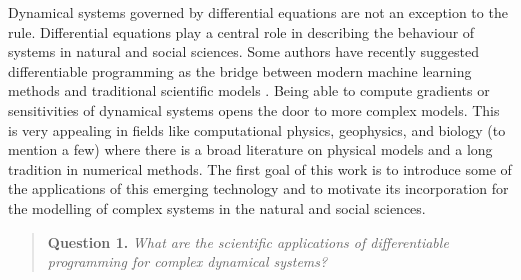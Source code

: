 Dynamical systems governed by differential equations are not an exception to the rule. 
Differential equations play a central role in describing the behaviour of systems in natural and social sciences. 
Some authors have recently suggested differentiable programming as the bridge between modern machine learning methods and traditional scientific models \cite{Ramsundar_Krishnamurthy_Viswanathan_2021, Shen_diff_modelling, Gelbrecht-differential-programming-Earth}. 
Being able to compute gradients or sensitivities of dynamical systems opens the door to more complex models.
This is very appealing in fields like computational physics, geophysics, and biology (to mention a few) where there is a broad literature on physical models and a long tradition in numerical methods. 
The first goal of this work is to introduce some of the applications of this emerging technology and to motivate its incorporation for the modelling of complex systems in the natural and social sciences. 
\begin{quote}
    \textbf{Question 1. }
    \textit{What are the scientific applications of differentiable programming for complex dynamical systems?}
\end{quote}

